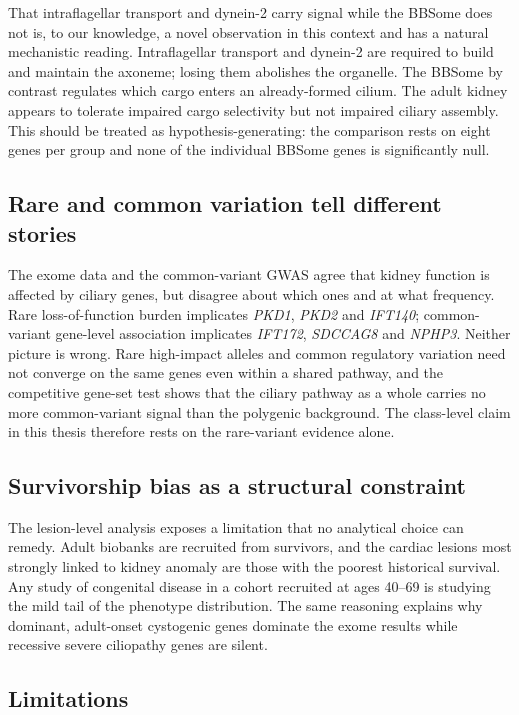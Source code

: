 \documentclass[11pt,a4paper]{article}
\newcommand{\gene}[1]{\textit{#1}}
\begin{document}
That intraflagellar transport and dynein-2 carry signal while the BBSome does not is, to our
knowledge, a novel observation in this context and has a natural mechanistic reading.
Intraflagellar transport and dynein-2 are required to build and maintain the axoneme; losing
them abolishes the organelle. The BBSome by contrast regulates which cargo enters an
already-formed cilium. The adult kidney appears to tolerate impaired cargo selectivity but
not impaired ciliary assembly. This should be treated as hypothesis-generating: the
comparison rests on eight genes per group and none of the individual BBSome genes is
significantly null.

\subsection{Rare and common variation tell different stories}

The exome data and the common-variant GWAS agree that kidney function is affected by
ciliary genes, but disagree about which ones and at what frequency. Rare loss-of-function
burden implicates \gene{PKD1}, \gene{PKD2} and \gene{IFT140}; common-variant gene-level
association implicates \gene{IFT172}, \gene{SDCCAG8} and \gene{NPHP3}. Neither picture is
wrong. Rare high-impact alleles and common regulatory variation need not converge on the
same genes even within a shared pathway, and the competitive gene-set test shows that the
ciliary pathway as a whole carries no more common-variant signal than the polygenic
background. The class-level claim in this thesis therefore rests on the rare-variant
evidence alone.

\subsection{Survivorship bias as a structural constraint}

The lesion-level analysis exposes a limitation that no analytical choice can remedy. Adult
biobanks are recruited from survivors, and the cardiac lesions most strongly linked to kidney
anomaly are those with the poorest historical survival. Any study of congenital disease in a
cohort recruited at ages 40--69 is studying the mild tail of the phenotype distribution. The
same reasoning explains why dominant, adult-onset cystogenic genes dominate the exome
results while recessive severe ciliopathy genes are silent.

\subsection{Limitations}
\end{document}
